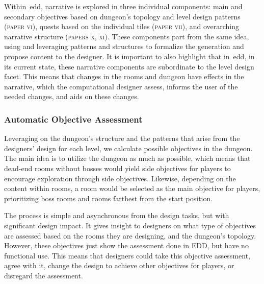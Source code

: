 Within~\acrshort{edd}, narrative is explored in three individual components: main and secondary objectives based on dungeon's topology and level design patterns (\textsc{paper vi}), quests based on the individual tiles (\textsc{paper vii}), and overarching narrative structure (\textsc{papers x, xi}). These components part from the same idea, using and leveraging patterns and structures to formalize the generation and propose content to the designer. It is important to also highlight that in~\acrshort{edd}, in its current state, these narrative components are subordinate to the level design facet. This means that changes in the rooms and dungeon have effects in the narrative, which the computational designer assess, informs the user of the needed changes, and aids on these changes.



\subsubsection{Automatic Objective Assessment}

Leveraging on the dungeon's structure and the patterns that arise from the designers' design for each level, we calculate possible objectives in the dungeon. The main idea is to utilize the dungeon as much as possible, which means that dead-end rooms without bosses would yield side objectives for players to encourage exploration through side objectives. Likewise, depending on the content within rooms, a room would be selected as the main objective for players, prioritizing boss rooms and rooms farthest from the start position. 

The process is simple and asynchronous from the design tasks, but with significant design impact. It gives insight to designers on what type of objectives are assessed based on the rooms they are designing, and the dungeon's topology. However, these objectives just show the assessment done in EDD, but have no functional use. This means that designers could take this objective assessment, agree with it, change the design to achieve other objectives for players, or disregard the assessment. 

